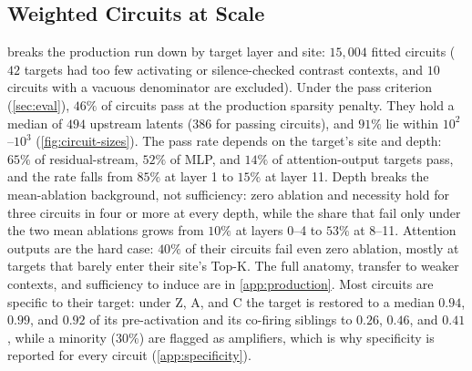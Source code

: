 \documentclass[10pt]{article}
\begin{document}
\subsection{Weighted Circuits at Scale}
\label{sec:main-result}
 breaks the production run down by target layer and site: $15{,}004$ fitted circuits ($42$ targets had too few activating or silence-checked contrast contexts, and $10$ circuits with a vacuous denominator are excluded).
Under the pass criterion (\cref{sec:eval}), $46\%$ of circuits pass at the production sparsity penalty.
They hold a median of $494$ upstream latents ($386$ for passing circuits), and $91\%$ lie within $10^{2}$--$10^{3}$ (\cref{fig:circuit-sizes}).
The pass rate depends on the target's site and depth: $65\%$ of residual-stream, $52\%$ of MLP, and $14\%$ of attention-output targets pass, and the rate falls from $85\%$ at layer 1 to $15\%$ at layer 11.
Depth breaks the mean-ablation background, not sufficiency: zero ablation and necessity hold for three circuits in four or more at every depth, while the share that fail only under the two mean ablations grows from $10\%$ at layers 0--4 to $53\%$ at 8--11.
Attention outputs are the hard case: $40\%$ of their circuits fail even zero ablation, mostly at targets that barely enter their site's Top-K.
The full anatomy, transfer to weaker contexts, and sufficiency to induce are in \cref{app:production}.
Most circuits are specific to their target: under Z, A, and C the target is restored to a median $0.94$, $0.99$, and $0.92$ of its pre-activation and its co-firing siblings to $0.26$, $0.46$, and $0.41$, while a minority ($30\%$) are flagged as amplifiers, which is why specificity is reported for every circuit (\cref{app:specificity}).
\end{document}
